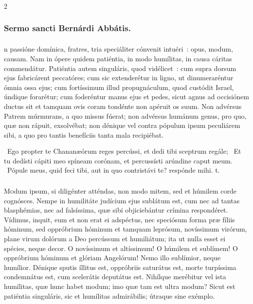 \documentclass[9pt,twoside]{extarticle}
\begin{document}
\begin{multicols}{2}
{\subsubsection*{\center Sermo sancti Bernárdi Abbátis.}
\subsubsection*{\center {}}
n passióne domínica, fratres, tria speciáliter cónvenit intuéri~: opus, modum, causam. Nam in ópere quidem patiéntia, in modo humílitas, in causa cáritas commendátur. Patiéntia autem singuláris, quod vidélicet~: cum supra dorsum ejus fabricárent peccatóres; cum sic extenderétur in ligno, ut dinumeraréntur ómnia ossa ejus; cum fortíssimum illud propugnáculum, quod custódit Israel, úndique forarétur; cum foderéntur manus ejus et pedes, sicut agnus ad occisiónem ductus sit et tamquam ovis coram tondénte non apéruit os suum. Non advérsus Patrem múrmurans, a quo missus fúerat; non advérsus humánum genus, pro quo, quæ non rápuit, exsolvébat; non dénique vel contra pópulum ipsum peculiárem sibi, a quo pro tantis benefíciis tanta mala recipiébat.

\begin{tightlist}{}
\item {}~Ego propter te Chananæórum reges percússi, et dedi tibi sceptrum regále; \textred{*}~Et tu dedísti cápiti meo spíneam corónam, et percussísti arúndine caput meum. ~Pópule meus, quid feci tibi, aut in quo contristávi te? respónde mihi. t.
\end{tightlist}

\subsubsection*{\center {}}
\lettrine{M}odum ipsum, si diligénter atténdas, non modo mitem, sed et húmilem corde cognósces. Nempe in humilitáte judícium ejus sublátum est, cum nec ad tantas blasphémias, nec ad falsíssima, quæ sibi objiciebántur crímina respondéret. Vídimus, inquit, eum et non erat ei adspéctus, nec speciósum forma præ fíliis hóminum, sed oppróbrium hóminum et tamquam leprósum, novíssimum virórum, plane virum dolórum a Deo percússum et humiliátum; ita ut nulla esset ei spécies, neque decor. O novíssimum et altíssimum! O húmilem et sublímem! O oppróbrium hóminum et glóriam Angelórum! Nemo illo sublímior, neque humílior. Dénique sputis íllitus est, oppróbriis saturátus est, morte turpíssima condemnátus est, cum scelerátis deputátus est. Nihílque merébitur vel ista humílitas, quæ hunc habet modum; imo quæ tam est ultra modum? Sicut est patiéntia singuláris, sic et humílitas admirábilis; útraque sine exémplo.

}
\end{multicols}
\end{document}
